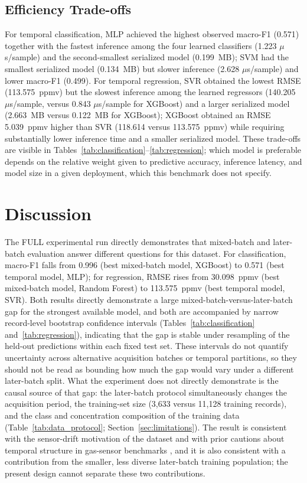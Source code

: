 \documentclass[conference]{IEEEtran}
\begin{document}
\subsection{Efficiency Trade-offs}
For temporal classification, MLP achieved the highest observed macro-F1 (0.571) together with the fastest inference among the four learned classifiers (1.223 $\mu$s/sample) and the second-smallest serialized model (0.199~MB); SVM had the smallest serialized model (0.134~MB) but slower inference (2.628 $\mu$s/sample) and lower macro-F1 (0.499). For temporal regression, SVR obtained the lowest RMSE (113.575~ppmv) but the slowest inference among the learned regressors (140.205 $\mu$s/sample, versus 0.843 $\mu$s/sample for XGBoost) and a larger serialized model (2.663~MB versus 0.122~MB for XGBoost); XGBoost obtained an RMSE 5.039~ppmv higher than SVR (118.614 versus 113.575~ppmv) while requiring substantially lower inference time and a smaller serialized model. These trade-offs are visible in Tables~\ref{tab:classification}--\ref{tab:regression}; which model is preferable depends on the relative weight given to predictive accuracy, inference latency, and model size in a given deployment, which this benchmark does not specify.

\section{Discussion}
The FULL experimental run directly demonstrates that mixed-batch and later-batch evaluation answer different questions for this dataset. For classification, macro-F1 falls from 0.996 (best mixed-batch model, XGBoost) to 0.571 (best temporal model, MLP); for regression, RMSE rises from 30.098~ppmv (best mixed-batch model, Random Forest) to 113.575~ppmv (best temporal model, SVR). Both results directly demonstrate a large mixed-batch-versus-later-batch gap for the strongest available model, and both are accompanied by narrow record-level bootstrap confidence intervals (Tables~\ref{tab:classification} and~\ref{tab:regression}), indicating that the gap is stable under resampling of the held-out predictions within each fixed test set. These intervals do not quantify uncertainty across alternative acquisition batches or temporal partitions, so they should not be read as bounding how much the gap would vary under a different later-batch split. What the experiment does not directly demonstrate is the causal source of that gap: the later-batch protocol simultaneously changes the acquisition period, the training-set size (3,633 versus 11,128 training records), and the class and concentration composition of the training data (Table~\ref{tab:data_protocol}; Section~\ref{sec:limitations}). The result is consistent with the sensor-drift motivation of the dataset and with prior cautions about temporal structure in gas-sensor benchmarks \cite{dennler2022}, and it is also consistent with a contribution from the smaller, less diverse later-batch training population; the present design cannot separate these two contributions.
\end{document}
